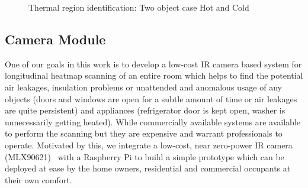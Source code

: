 				
\begin{figure}[t!]
					\begin{minipage}{0.00\textwidth}
						\mbox{}
					\end{minipage}
					\begin{minipage}{0.48\textwidth}
						\begin{center}
							\scriptsize{
								}
											\caption{Thermal region identification: Two object case Hot and Cold}
											\label{algo:Two Object}
										\end{center}
									\end{minipage}
\end{figure}				
	
	
	
	
\subsection{Camera Module}
\label{sec:camera}

One of our goals in this work is to develop a low-cost IR camera based system for longitudinal heatmap scanning of an entire room which helps to find the potential air leakages, insulation problems or unattended and anomalous usage of any objects (doors and windows are open for a subtle amount of time or air leakages are quite persistent) and appliances (refrigerator door is kept open, washer is unnecessarily getting heated). While commercially available systems are available to perform the scanning but they are expensive and warrant professionals to operate. Motivated by this, we integrate a low-cost, near zero-power IR camera (MLX90621)~\cite{MLX} with a Raspberry Pi to build a simple prototype which can be deployed at ease by the home owners, residential and commercial occupants at their own comfort. 

